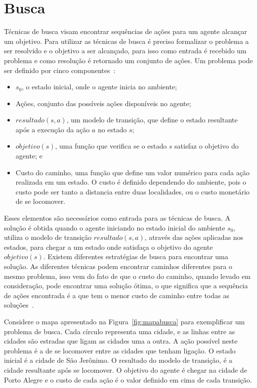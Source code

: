 \chapter{\label{chap:busca}Busca}

Técnicas de busca visam encontrar sequências de ações para um agente alcançar um objetivo.
Para utilizar as técnicas de busca é preciso formalizar o problema a ser resolvido e o objetivo a ser alcançado, para isso como entrada é recebido um problema e como resolução é retornado um conjunto de ações.
Um problema pode ser definido por cinco componentes~\cite[Capítulo 3]{intelligence2003modern}: 

\begin{itemize}
	\item $s_{0}$, o estado inicial, onde o agente inicia no ambiente;
	\item Ações, conjunto das possíveis ações disponíveis no agente;
	\item $resultado(s, a)$, um modelo de transição, que define o estado resultante após a execução da ação $a$ no estado $s$;
	\item $objetivo(s)$, uma função que verifica se o estado $s$ satisfaz o objetivo do agente; e
	\item Custo do caminho, uma função que define um valor numérico para cada ação realizada em um estado. O custo é definido dependendo do ambiente, pois o custo pode ser tanto a distancia entre duas localidades, ou o custo monetário de se locomover. 
\end{itemize}   

Esses elementos são necessários como entrada para as técnicas de busca.
A solução é obtida quando o agente iniciando no estado inicial do ambiente $s_{0}$, utiliza o modelo de transição $resultado(s, a)$, através das ações aplicadas nos estados, para chegar a um estado onde satisfaça o objetivo do agente $objetivo(s)$.
Existem diferentes estratégias de busca para encontrar uma solução.
As diferentes técnicas podem encontrar caminhos diferentes para o mesmo problema, isso vem do fato de que o custo do caminho, quando levado em consideração, pode encontrar uma solução ótima, o que significa que a sequência de ações encontrada é a que tem o menor custo de caminho entre todas as soluções~\cite[Capítulo 3]{intelligence2003modern}.

Considere o mapa apresentado na Figura~\ref{fig:mapabusca} para exemplificar um problema de busca.
Cada círculo representa uma cidade, e as linhas entre as cidades são estradas que ligam as cidades uma a outra. 
A ação possível neste problema é a de se locomover entre as cidades que tenham ligação.
O estado inicial é a cidade de São Jerônimo. O resultado do modelo de transição, é a cidade resultante após se locomover. O objetivo do agente é chegar na cidade de Porto Alegre e o custo de cada ação é o valor definido em cima de cada transição. 

